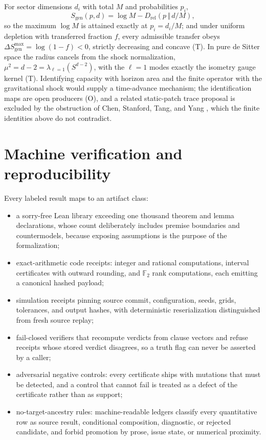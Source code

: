 \documentclass[11pt]{article}
\theoremstyle{remark}
\newcommand{\evT}{\textsf{T}}   %
\newcommand{\evO}{\textsf{O}}   %
\begin{document}
For sector dimensions $d_i$ with total $M$ and probabilities $p_i$,
\begin{equation}
S_{\mathrm{gen}}(p,d)=\log M-D_{\mathrm{rel}}(p\,\Vert\,d/M),
\end{equation}
so the maximum $\log M$ is attained exactly at $p_i=d_i/M$; and under
uniform depletion with transferred fraction $f$, every admissible transfer
obeys $\Delta S^{\max}_{\mathrm{gen}}=\log(1-f)<0$, strictly decreasing and
concave (\evT). In pure de Sitter space the radius cancels from the shock
normalization, $\mu^{2}=d-2=\lambda_{\ell=1}(S^{d-2})$, with the $\ell=1$
modes exactly the isometry gauge kernel (\evT). Identifying capacity with
horizon area and the finite operator with the gravitational shock would
supply a time-advance mechanism; the identification maps are open producers
(\evO), and a related static-patch trace proposal is excluded by the
obstruction of Chen, Stanford, Tang, and Yang \cite{csty2026}, which the
finite identities above do not contradict.

\section{Machine verification and reproducibility}
\label{sec:verification}

Every labeled result maps to an artifact class:

\begin{itemize}[leftmargin=1.4em]
\item a sorry-free Lean library exceeding one thousand theorem and lemma
declarations, whose count deliberately includes premise boundaries and
countermodels, because exposing assumptions is the purpose of the
formalization;
\item exact-arithmetic code receipts: integer and rational computations,
interval certificates with outward rounding, and $\mathbb F_{2}$ rank
computations, each emitting a canonical hashed payload;
\item simulation receipts pinning source commit, configuration, seeds,
grids, tolerances, and output hashes, with deterministic reserialization
distinguished from fresh source replay;
\item fail-closed verifiers that recompute verdicts from clause vectors and
refuse receipts whose stored verdict disagrees, so a truth flag can never be
asserted by a caller;
\item adversarial negative controls: every certificate ships with mutations
that must be detected, and a control that cannot fail is treated as a defect
of the certificate rather than as support;
\item no-target-ancestry rules: machine-readable ledgers classify every
quantitative row as source result, conditional composition, diagnostic, or
rejected candidate, and forbid promotion by prose, issue state, or numerical
proximity.
\end{itemize}
\end{document}
